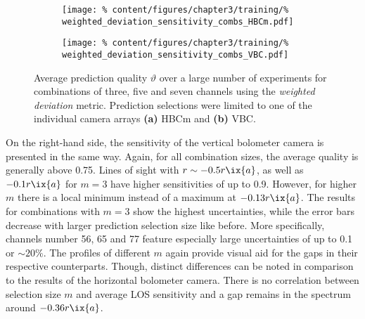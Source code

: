                 \begin{figure}[t]%
                    \centering%
                    \begin{subfigure}{0.47\textwidth}%
                        \texttt{[image: \%
                            content/figures/chapter3/training/\%
                            weighted\_deviation\_sensitivity\_combs\_HBCm.pdf]}%
                        \caption{}%
                    \end{subfigure}%
                    \hfill%
                    \begin{subfigure}{0.47\textwidth}%
                        \texttt{[image: \%
                            content/figures/chapter3/training/\%
                            weighted\_deviation\_sensitivity\_combs\_VBC.pdf]}%
                        \caption{}%
                    \end{subfigure}%
                    \caption{Average prediction quality $\vartheta$ over a large number of experiments for combinations of three, five and seven channels using the \textit{weighted deviation} metric. Prediction selections were limited to one of the individual camera arrays \textbf{(a)} HBCm and \textbf{(b)} VBC.}\label{fig:results_weighted_deviation}%
                \end{figure}%
%
                On the right-hand side, the sensitivity of the vertical bolometer camera is presented in the same way. Again, for all combination sizes, the average quality is generally above 0.75. Lines of sight with $r\sim-0.5r\ix{a}$, as well as $-0.1r\ix{a}$ for $m=3$ have higher sensitivities of up to 0.9. However, for higher $m$ there is a local minimum instead of a maximum at $-0.13r\ix{a}$. The results for combinations with $m=3$ show the highest uncertainties, while the error bars decrease with larger prediction selection size like before. More specifically, channels number 56, 65 and 77 feature especially large uncertainties of up to 0.1 or $\sim20\%$. The profiles of different $m$ again provide visual aid for the gaps in their respective counterparts. Though, distinct differences can be noted in comparison to the results of the horizontal bolometer camera. There is no correlation between selection size $m$ and average LOS sensitivity and a gap remains in the spectrum around $-0.36r\ix{a}$.\\%
